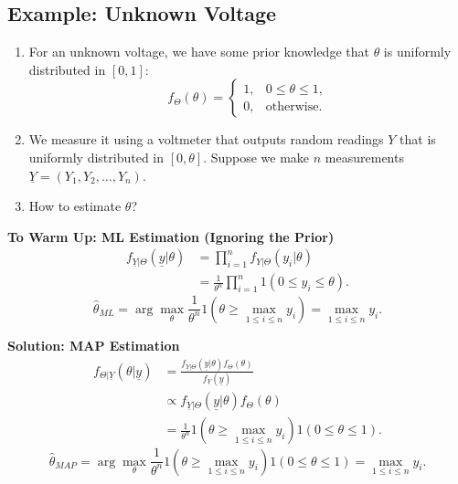 \subsection{Example: Unknown Voltage}
\begin{example}
    \begin{enumerate}
        \item For an unknown voltage, we have some prior knowledge that $\theta$ is uniformly distributed in $[0, 1]$:
        \[
        f_\Theta(\theta) =
        \begin{cases}
            1, & 0 \leq \theta \leq 1, \\
            0, & \text{otherwise}.
        \end{cases}
        \]
        \item We measure it using a voltmeter that outputs random readings $Y$ that is uniformly distributed in $[0, \theta]$. Suppose we make $n$ measurements $\underline{Y} = (Y_1, Y_2, \ldots, Y_n)$.
        \item How to estimate $\theta$?
    \end{enumerate}
    \vspace{1em}
    
    \textbf{To Warm Up: ML Estimation (Ignoring the Prior)}
    \begin{align*}
    f_{\underline{Y}|\Theta}(\underline{y}|\theta) &= \prod_{i=1}^n f_{Y|\Theta}(y_i|\theta) \\
    &= \frac{1}{\theta^n} \prod_{i=1}^n 1(0 \leq y_i \leq \theta).
    \end{align*}
    \[
    \hat{\theta}_{ML} = \arg\max_{\theta} \frac{1}{\theta^n} 1(\theta \geq \max_{1 \leq i \leq n} y_i) = \max_{1 \leq i \leq n} y_i.
    \]
    
    \textbf{Solution: MAP Estimation}
    \begin{align*}
    f_{\Theta|\underline{Y}}(\theta|\underline{y}) &= \frac{f_{\underline{Y}|\Theta}(\underline{y}|\theta) f_\Theta(\theta)}{f_{\underline{Y}}(\underline{y})} \\
    &\propto f_{\underline{Y}|\Theta}(\underline{y}|\theta) f_\Theta(\theta) \\
    &= \frac{1}{\theta^n} 1(\theta \geq \max_{1 \leq i \leq n} y_i) 1(0 \leq \theta \leq 1).
    \end{align*}
    \[
    \hat{\theta}_{MAP} = \arg\max_{\theta} \frac{1}{\theta^n} 1(\theta \geq \max_{1 \leq i \leq n} y_i) 1(0 \leq \theta \leq 1) = \max_{1 \leq i \leq n} y_i.
    \]
    

\end{example}
